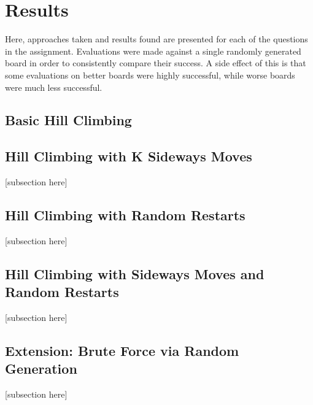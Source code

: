 \section{Results}
\label{section:results}
Here, approaches taken and results found are presented for each of the questions in the assignment. Evaluations were
made against a single randomly generated board in order to consistently compare their success. A side effect of this
is that some evaluations on better boards were highly successful, while worse boards were much less successful.

\subsection{Basic Hill Climbing}


\subsection{Hill Climbing with K Sideways Moves}
[subsection here]

\subsection{Hill Climbing with Random Restarts}
[subsection here]

\subsection{Hill Climbing with Sideways Moves and Random Restarts}
[subsection here]

\subsection{Extension: Brute Force via Random Generation}
[subsection here]
